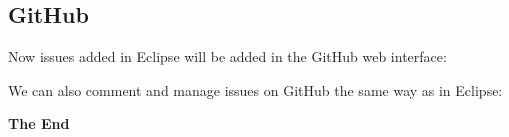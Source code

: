 \documentclass{beamer}
\begin{document}
\subsection{GitHub}
\begin{frame}
  Now issues added in Eclipse will be added in the GitHub web interface:

\end{frame}

\begin{frame}
  We can also comment and manage issues on GitHub the same way as in Eclipse:

\end{frame}

\begin{frame}
  \begin{center}
  {\bfseries \Huge The End}
  \end{center}
\end{frame}
\end{document}
